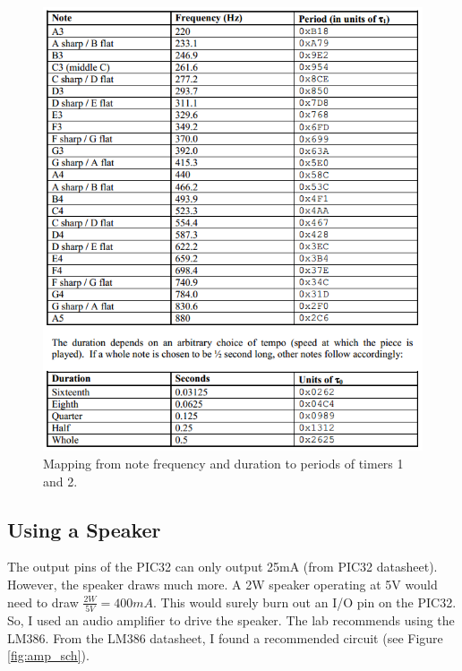 \documentclass[11pt]{article}
\begin{document}
\begin{figure}[h!]
\centering
\includegraphics[scale=0.8]{notes_and_duration.png}
\caption{Mapping from note frequency and duration to periods of timers 1 and 2.}
\label{fig:freq_and_dur}
\end{figure} 



\subsection{Using a Speaker}

The output pins of the PIC32 can only output 25mA (from PIC32 datasheet). However, the speaker draws much more. A 2W speaker operating at 5V would need to draw $\frac{2W}{5V} = 400mA$. This would surely burn out an I/O pin on the PIC32. So, I used an audio amplifier to drive the speaker. The lab recommends using the LM386. From the LM386 datasheet, I found a recommended circuit (see Figure \ref{fig:amp_sch}). \\
\end{document}
